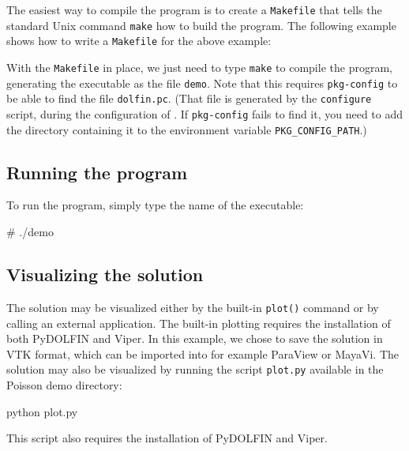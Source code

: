 The easiest way to compile the program is to create a
\texttt{Makefile} that tells the standard Unix command \texttt{make}
how to build the program. The following example shows how to write a
\texttt{Makefile} for the above example:
\footnotesize
{}
\normalsize

With the \texttt{Makefile} in place, we just need to type
\texttt{make} to compile the program, generating the executable as the
file \texttt{demo}. Note that this requires \texttt{pkg-config} to be
able to find the file \texttt{dolfin.pc}. (That file is generated by
the \texttt{configure} script, during the configuration of
\dolfin{}. If \texttt{pkg-config} fails to find it, you need to add
the directory containing it to the environment variable
\texttt{PKG\_CONFIG\_PATH}.)

\subsection{Running the program}

To run the program, simply type the name of the executable:
\begin{code}
# ./demo
\end{code}

\subsection{Visualizing the solution}

The solution may be visualized either by the built-in \texttt{plot()}
command or by calling an external application. The built-in plotting
requires the installation of both PyDOLFIN and Viper. In this
example, we chose to save the solution in VTK format, which can be
imported into for example ParaView or MayaVi. The solution may also be
visualized by running the script \texttt{plot.py} available in the
Poisson demo directory:
\begin{code}
python plot.py
\end{code}
This script also requires the installation of PyDOLFIN and Viper.

